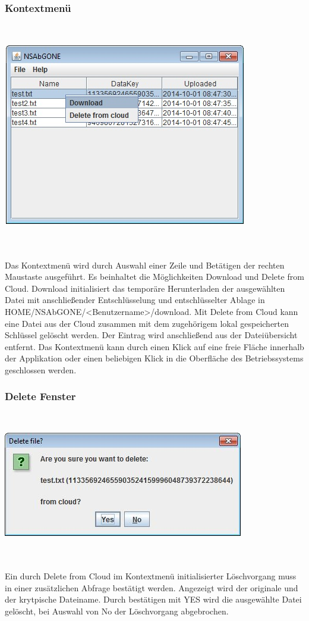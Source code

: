 \documentclass[13pt,a4paper,bibliography=totocnumbered,listof=totocnumbered]{scrartcl}
\begin{document}
\subsubsection{Kontextmenü}
$\;$\\
\begin{minipage}{\linewidth}
	\centering
	\includegraphics[width=0.4\linewidth]{./img/Kontext.jpg}
	\label{Kontext}
\end{minipage}
\\\\Das Kontextmenü wird durch Auswahl einer Zeile und Betätigen der rechten Maustaste ausgeführt. Es beinhaltet die Möglichkeiten Download und Delete from Cloud. Download initialisiert das temporäre Herunterladen der ausgewählten Datei mit anschließender Entschlüsselung und entschlüsselter Ablage in HOME/NSAbGONE/\textless Benutzername\textgreater/download. Mit Delete from Cloud kann eine Datei aus der Cloud zusammen mit dem zugehörigem lokal gespeicherten Schlüssel gelöscht werden. Der Eintrag wird anschließend aus der Dateiübersicht entfernt. Das Kontextmenü kann durch einen Klick auf eine freie Fläche innerhalb der Applikation oder einen beliebigen Klick in die Oberfläche des Betriebssystems geschlossen werden.

\subsubsection{Delete Fenster}
$\;$\\
\begin{minipage}{\linewidth}
	\centering
	\includegraphics[width=0.4\linewidth]{./img/Delete.jpg}
	\label{Delete}
\end{minipage}
\\\\Ein durch Delete from Cloud im Kontextmenü initialisierter Löschvorgang muss in einer zusätzlichen Abfrage bestätigt werden. Angezeigt wird der originale und der krytpische Dateiname. Durch bestätigen mit YES wird die ausgewählte Datei gelöscht, bei Auswahl von No der Löschvorgang abgebrochen.
\end{document}
